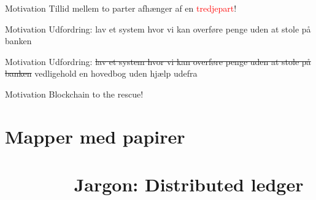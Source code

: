\documentclass[usenames, dvipsnames]{beamer}
\begin{document}
  \begin{frame}{Motivation}
    \center Tillid mellem to parter afhænger af en \textcolor{red}{tredjepart}!
  \end{frame}
  \begin{frame}{Motivation}
    \center Udfordring:
      \center lav et system hvor vi kan overføre penge uden at stole på banken
  \end{frame}
  \begin{frame}{Motivation}
      \center Udfordring:
      \center \sout{lav et system hvor vi kan overføre penge uden at stole på banken}
      \center vedligehold en hovedbog uden hjælp udefra
  \end{frame}
  \begin{frame}{Motivation}
	\center Blockchain to the rescue!
  \end{frame}
  \section{Mapper med papirer \ \ \ \ \ \ \ \ \ \ \ \ \ \ \ \ \ \ \ \ \ \ \ \ \ \ \ \ \ \ \ \ \ \ \ \ \ \ \small Jargon: Distributed ledger}
\end{document}
